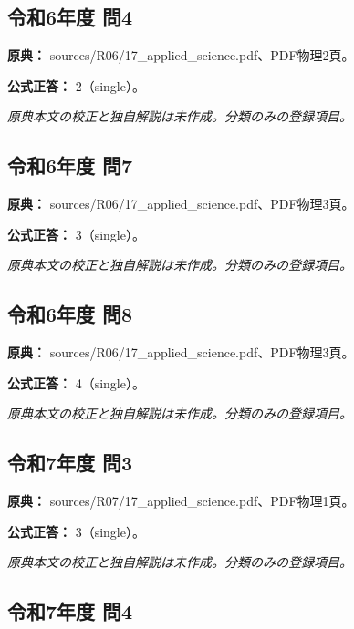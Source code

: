 \subsection{令和6年度 問4}
\label{q:r06-reg-applied-04}

\noindent\textbf{原典：} sources/R06/17\_applied\_science.pdf、PDF物理2頁。

\textbf{公式正答：} 2（single）。

\par\textit{原典本文の校正と独自解説は未作成。分類のみの登録項目。}

\subsection{令和6年度 問7}
\label{q:r06-reg-applied-07}

\noindent\textbf{原典：} sources/R06/17\_applied\_science.pdf、PDF物理3頁。

\textbf{公式正答：} 3（single）。

\par\textit{原典本文の校正と独自解説は未作成。分類のみの登録項目。}

\subsection{令和6年度 問8}
\label{q:r06-reg-applied-08}

\noindent\textbf{原典：} sources/R06/17\_applied\_science.pdf、PDF物理3頁。

\textbf{公式正答：} 4（single）。

\par\textit{原典本文の校正と独自解説は未作成。分類のみの登録項目。}

\subsection{令和7年度 問3}
\label{q:r07-reg-applied-03}

\noindent\textbf{原典：} sources/R07/17\_applied\_science.pdf、PDF物理1頁。

\textbf{公式正答：} 3（single）。

\par\textit{原典本文の校正と独自解説は未作成。分類のみの登録項目。}

\subsection{令和7年度 問4}
\label{q:r07-reg-applied-04}

